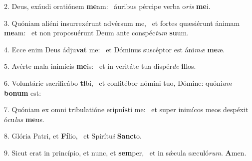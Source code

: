 2. Deus, exáudi oratiónem \textbf{me}am: \ast\  áuribus pércipe verba o\textit{ris} \textbf{me}i.\

3. Quóniam aliéni insurrexérunt advérsum me, \dag\  et fortes quæsiérunt ánimam \textbf{me}am: \ast\  et non proposuérunt Deum ante conspéc\textit{tum} \textbf{su}um.\

4. Ecce enim Deus ádju\textbf{vat} me: \ast\  et Dóminus suscéptor est áni\textit{mæ} \textbf{me}æ.\

5. Avérte mala inimícis \textbf{me}is: \ast\  et in veritáte tua dispér\textit{de} \textbf{il}los.\

6. Voluntárie sacrificábo \textbf{ti}bi, \ast\  et confitébor nómini tuo, Dómine: quóni\textit{am} \textbf{bo}\textbf{num} est:\

7. Quóniam ex omni tribulatióne eripu\textbf{ís}ti me: \ast\  et super inimícos meos despéxit ócu\textit{lus} \textbf{me}us.\

8. Glória Patri, et \textbf{Fí}lio, \ast\  et Spirítu\textit{i} \textbf{Sanc}to.\

9. Sicut erat in princípio, et nunc, et \textbf{sem}per, \ast\  et in sǽcula sæculó\textit{rum}. \textbf{A}men.\

